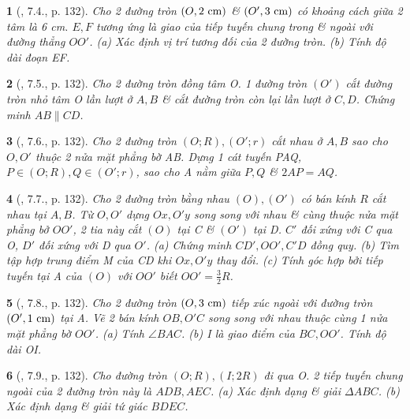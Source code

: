 \documentclass{article}
\newtheorem{baitoan}{}
\begin{document}
\begin{baitoan}[\cite{Binh_boi_duong_Toan_9_tap_1}, 7.4., p. 132]
	Cho 2 đường tròn $(O,2\ {\rm cm})$ \& $(O',3\ {\rm cm})$ có khoảng cách giữa 2 tâm là {\rm6 cm}. $E,F$ tương ứng là giao của tiếp tuyến chung trong \& ngoài với đường thẳng $OO'$. (a) Xác định vị trí tương đối của 2 đường tròn. (b) Tính độ dài đoạn EF.
\end{baitoan}

\begin{baitoan}[\cite{Binh_boi_duong_Toan_9_tap_1}, 7.5., p. 132]
	Cho 2 đường tròn đồng tâm O. 1 đường tròn $(O')$ cắt đường tròn nhỏ tâm O lần lượt ở $A,B$ \& cắt đường tròn còn lại lần lượt ở $C,D$. Chứng minh $AB\parallel CD$.
\end{baitoan}

\begin{baitoan}[\cite{Binh_boi_duong_Toan_9_tap_1}, 7.6., p. 132]
	Cho 2 đường tròn $(O;R),(O';r)$ cắt nhau ở $A,B$ sao cho $O,O'$ thuộc 2 nửa mặt phẳng bờ AB. Dựng 1 cát tuyến PAQ, $P\in(O;R),Q\in(O';r)$, sao cho A nằm giữa $P,Q$ \& $2AP = AQ$.
\end{baitoan}

\begin{baitoan}[\cite{Binh_boi_duong_Toan_9_tap_1}, 7.7., p. 132]
	Cho 2 đường tròn bằng nhau $(O),(O')$ có bán kính $R$ cắt nhau tại $A,B$. Từ $O,O'$ dựng $Ox,O'y$ song song với nhau \& cùng thuộc nửa mặt phẳng bở $OO'$, 2 tia này cắt $(O)$ tại C \& $(O')$ tại D. $C'$ đối xứng với C qua O, $D'$ đối xứng với D qua $O'$. (a) Chứng minh $CD',OO',C'D$ đồng quy. (b) Tìm tập hợp trung điểm M của CD khi $Ox,O'y$ thay đổi. (c) Tính góc hợp bởi tiếp tuyến tại A của $(O)$ với $OO'$ biết $OO' = \frac{3}{2}R$.
\end{baitoan}

\begin{baitoan}[\cite{Binh_boi_duong_Toan_9_tap_1}, 7.8., p. 132]
	Cho 2 đường tròn $(O,3\ {\rm cm})$ tiếp xúc ngoài với đường tròn $(O',1\ {\rm cm})$ tại A. Vẽ 2 bán kính $OB,O'C$ song song với nhau thuộc cùng 1 nửa mặt phẳng bờ $OO'$. (a) Tính $\angle{BAC}$. (b) I là giao điểm của $BC,OO'$. Tính độ dài OI.
\end{baitoan}

\begin{baitoan}[\cite{Binh_boi_duong_Toan_9_tap_1}, 7.9., p. 132]
	Cho đường tròn $(O;R),(I;2R)$ đi qua O. 2 tiếp tuyến chung ngoài của 2 đường tròn này là $ADB,AEC$. (a) Xác định dạng \& giải $\Delta ABC$. (b) Xác định dạng \& giải tứ giác $BDEC$.
\end{baitoan}
\end{document}

